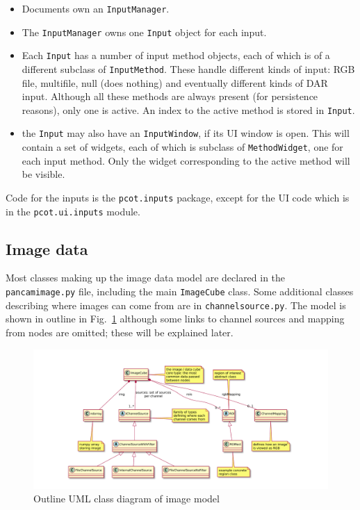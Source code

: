 \begin{itemize}
\item Documents own an \texttt{InputManager}.
\item The \texttt{InputManager} owns one \texttt{Input} object for each input.
\item Each \texttt{Input} has a number of input method objects,
each of which is of a different subclass of \texttt{InputMethod}.
These handle different kinds of input: RGB file, multifile, null (does nothing)
and eventually different kinds of DAR input. Although all these methods are
always present (for persistence reasons), only one is active. An index
to the active method is stored in \texttt{Input}.
\item the \texttt{Input} may also have an \texttt{InputWindow}, if its
UI window is open. This will contain a set of widgets, each of which is
subclass of \texttt{MethodWidget}, one for each input method. Only the widget
corresponding to the active method will be visible.
\end{itemize}
Code for the inputs is the \texttt{pcot.inputs} package, except for the UI
code which is in the \texttt{pcot.ui.inputs} module.

\clearpage
\subsection{Image data}
Most classes making up the image data model are declared in the
\texttt{pancamimage.py} file, including the main \texttt{ImageCube} class.
Some additional classes describing where images can come from are in
\texttt{channelsource.py}. The model is shown in outline in
Fig.~\ref{image.pdf} although some links to channel sources and mapping from
nodes are omitted; these will be explained later.

\begin{figure}[ht]
\center
\includegraphics[width=7in]{image.pdf}
\caption{Outline UML class diagram of image model}
\label{image.pdf}
\end{figure}

